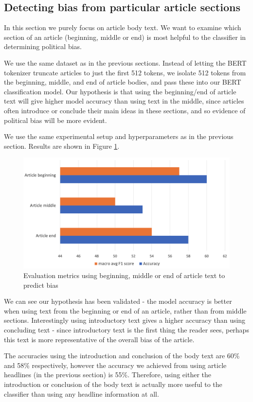 \subsection{Detecting bias from particular article sections} \label{sec:article-sections}

In this section we purely focus on article body text. We want to examine which section of an article (beginning, middle or end) is most helpful to the classifier in determining political bias.

We use the same dataset as in the previous sections. Instead of letting the BERT tokenizer truncate articles to just the first 512 tokens, we isolate 512 tokens from the beginning, middle, and end of article bodies, and pass these into our BERT classification model. Our hypothesis is that using the beginning/end of article text will give higher model accuracy than using text in the middle, since articles often introduce or conclude their main ideas in these sections, and so evidence of political bias will be more evident.

We use the same experimental setup and hyperparameters as in the previous section. Results are shown in Figure \ref{fig:nmr-beginning-middle-end}.

\begin{figure}
    \centering
    \includegraphics[scale=0.33]{0-img/nmr-beginning-middle-end.png}
    \caption{Evaluation metrics using beginning, middle or end of article text to predict bias}
    \label{fig:nmr-beginning-middle-end}
\end{figure}

We can see our hypothesis has been validated - the model accuracy is better when using text from the beginning or end of an article, rather than from middle sections. Interestingly using introductory text gives a higher accuracy than using concluding text - since introductory text is the first thing the reader sees, perhaps this text is more representative of the overall bias of the article.

The accuracies using the introduction and conclusion of the body text are 60\% and 58\% respectively, however the accuracy we achieved from using article headlines (in the previous section) is 55\%. Therefore, using either the introduction or conclusion of the body text is actually more useful to the classifier than using any headline information at all.